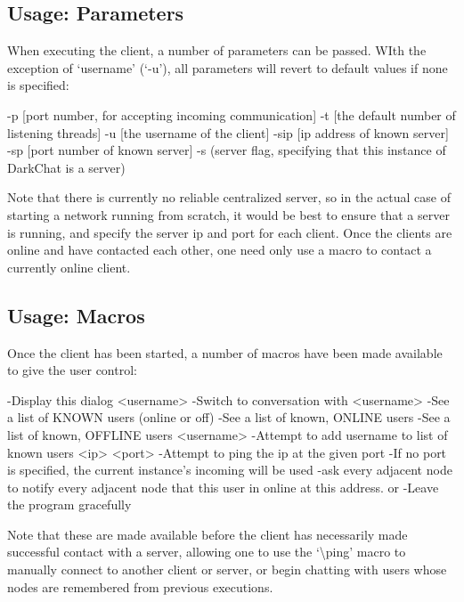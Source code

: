\documentclass[11pt]{article}
\begin{document}
\subsection{Usage: Parameters}

When executing the client, a number of parameters can be passed. WIth the exception of `username' (`-u'), all parameters will revert to default values if none is specified:

\begin{code}
-p [port number, for accepting incoming communication]
-t [the default number of listening threads]
-u [the username of the client]
-sip [ip address of known server]
-sp [port number of known server]
-s (server flag, specifying that this instance of DarkChat is a server)
\end{code}

Note that there is currently no reliable centralized server, so in the actual case of starting a network running from scratch, it would be best to ensure that a server is running, and specify the server ip and port for each client. Once the clients are online and have contacted each other, one need only use a macro to contact a currently online client.

\subsection{Usage: Macros}

Once the client has been started, a number of macros have been made available to give the user control:

\begin{code}
  \help
   -Display this dialog
  \chat <username>
   -Switch to conversation with <username>
  \users
   -See a list of KNOWN users (online or off)
  \online
   -See a list of known, ONLINE users
  \offline
   -See a list of known, OFFLINE users
  \add <username>
   -Attempt to add username to list of known users
  \ping <ip> <port>
  -Attempt to ping the ip at the given port
  -If no port is specified, the current instance's incoming will be used
  \explode
  -ask every adjacent node to notify every adjacent node that this user in online at this address.
  \quit or \exit
   -Leave the program gracefully
\end{code}

Note that these are made available before the client has necessarily made successful contact with a server, allowing one to use the `\textbackslash ping' macro to manually connect to another client or server, or begin chatting with users whose nodes are remembered from previous executions.
\end{document}
